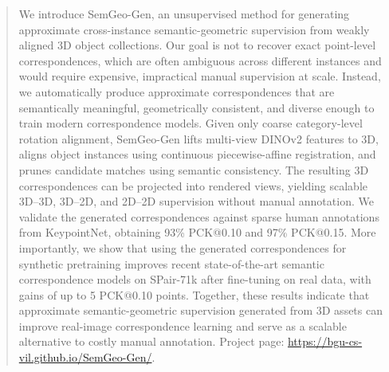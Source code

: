 \begin{abstract}
We introduce SemGeo-Gen, an unsupervised method for generating approximate cross-instance semantic-geometric supervision from weakly aligned 3D object collections. Our goal is not to recover exact point-level correspondences, which are often ambiguous across different instances and would require expensive, impractical manual supervision at scale. Instead, we automatically produce approximate correspondences that are semantically meaningful, geometrically consistent, and diverse enough to train modern correspondence models. Given only coarse category-level rotation alignment, SemGeo-Gen lifts multi-view DINOv2 features to 3D, aligns object instances using continuous piecewise-affine registration, and prunes candidate matches using semantic consistency. The resulting 3D correspondences can be projected into rendered views, yielding scalable 3D--3D, 3D--2D, and 2D--2D supervision without manual annotation. We validate the generated correspondences against sparse human annotations from KeypointNet, obtaining 93\% PCK@0.10 and 97\% PCK@0.15. More importantly, we show that using the generated correspondences for synthetic pretraining improves recent state-of-the-art semantic correspondence models on SPair-71k after fine-tuning on real data, with gains of up to 5 PCK@0.10 points. Together, these results indicate that approximate semantic-geometric supervision generated from 3D assets can improve real-image correspondence learning and serve as a scalable alternative to costly manual annotation. Project page:
\url{https://bgu-cs-vil.github.io/SemGeo-Gen/}.
\end{abstract}